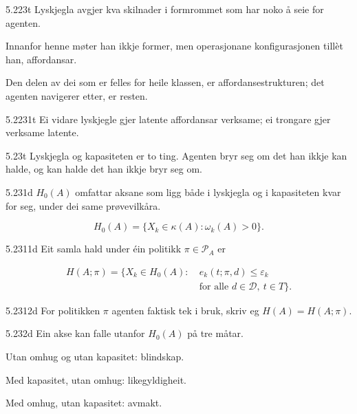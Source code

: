 \begin{formproposition}{5.223}{t}
Lyskjegla avgjer kva skilnader i formrommet som har noko å seie for agenten.

Innanfor henne møter han ikkje former, men operasjonane konfigurasjonen tillèt han, affordansar.

Den delen av dei som er felles for heile klassen, er affordansestrukturen; det agenten navigerer etter, er resten.
\end{formproposition}

\begin{formproposition}{5.2231}{t}
Ei vidare lyskjegle gjer latente affordansar verksame; ei trongare gjer verksame latente.
\end{formproposition}

\begin{formproposition}{5.23}{t}
Lyskjegla og kapasiteten er to ting. Agenten bryr seg om det han ikkje kan halde, og kan halde det han ikkje bryr seg om.
\end{formproposition}

\begin{formproposition}{5.231}{d}
\(H_0(A)\) omfattar aksane som ligg både i lyskjegla og i kapasiteten kvar for seg, under dei same prøvevilkåra.

\[
H_0(A)=\{X_k\in\kappa(A):\omega_k(A)>0\}.
\]
\end{formproposition}

\begin{formproposition}{5.2311}{d}
Eit samla hald under éin politikk \(\pi\in\mathcal P_A\) er

\[
\begin{aligned}
H(A;\pi)=\{X_k\in H_0(A):\ &e_k(t;\pi,d)\leq\varepsilon_k\\
&\text{for alle }d\in\mathcal D,\ t\in T\}.
\end{aligned}
\]
\end{formproposition}

\begin{formproposition}{5.2312}{d}
For politikken \(\pi\) agenten faktisk tek i bruk, skriv eg \(H(A)=H(A;\pi)\).
\end{formproposition}

\begin{formproposition}{5.232}{d}
Ein akse kan falle utanfor \(H_0(A)\) på tre måtar.

Utan omhug og utan kapasitet: blindskap.

Med kapasitet, utan omhug: likegyldigheit.

Med omhug, utan kapasitet: avmakt.
\end{formproposition}

